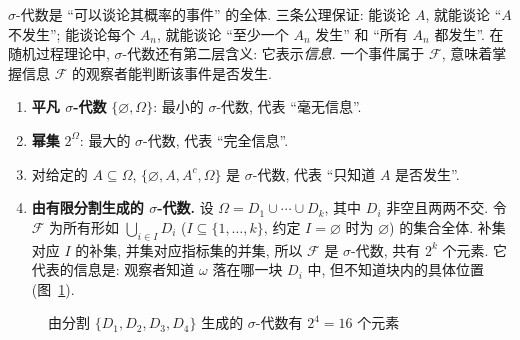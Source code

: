 \begin{intuition}
$\sigma$-代数是 ``可以谈论其概率的事件'' 的全体. 三条公理保证: 能谈论 $A$, 就能谈论 ``$A$ 不发生''; 能谈论每个 $A_n$, 就能谈论 ``至少一个 $A_n$ 发生'' 和 ``所有 $A_n$ 都发生''. 在随机过程理论中, $\sigma$-代数还有第二层含义: 它表示\emph{信息}. 一个事件属于 $\mathcal{F}$, 意味着掌握信息 $\mathcal{F}$ 的观察者能判断该事件是否发生.
\end{intuition}

\begin{example}\label{ex:sigma-examples}
\begin{enumerate}
\item \textbf{平凡 $\sigma$-代数} $\{\varnothing,\Omega\}$: 最小的 $\sigma$-代数, 代表 ``毫无信息''.
\item \textbf{幂集} $2^\Omega$: 最大的 $\sigma$-代数, 代表 ``完全信息''.
\item 对给定的 $A\subseteq\Omega$, $\{\varnothing,A,A^c,\Omega\}$ 是 $\sigma$-代数, 代表 ``只知道 $A$ 是否发生''.
\item \textbf{由有限分割生成的 $\sigma$-代数.} 设 $\Omega=D_1\cup\cdots\cup D_k$, 其中 $D_i$ 非空且两两不交. 令 $\mathcal{F}$ 为所有形如 $\bigcup_{i\in I}D_i$ ($I\subseteq\{1,\dots,k\}$, 约定 $I=\varnothing$ 时为 $\varnothing$) 的集合全体. 补集对应 $I$ 的补集, 并集对应指标集的并集, 所以 $\mathcal{F}$ 是 $\sigma$-代数, 共有 $2^k$ 个元素. 它代表的信息是: 观察者知道 $\omega$ 落在哪一块 $D_i$ 中, 但不知道块内的具体位置 (图~\ref{fig:partition}).
\end{enumerate}
\end{example}

\begin{figure}[htbp]
\centering
{}
\caption{由分割 $\{D_1,D_2,D_3,D_4\}$ 生成的 $\sigma$-代数有 $2^4=16$ 个元素}
\label{fig:partition}
\end{figure}

